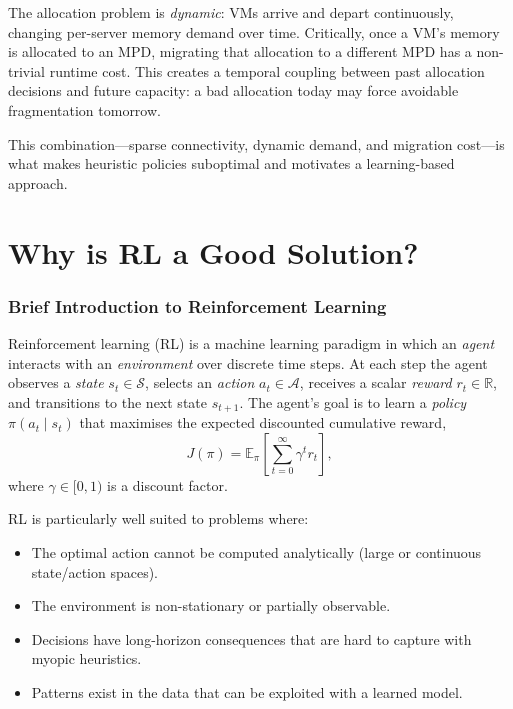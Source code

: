 \documentclass[11pt]{article}
\begin{document}
The allocation problem is \emph{dynamic}: VMs arrive and depart continuously,
changing per-server memory demand over time.  Critically, once a VM's memory is
allocated to an MPD, migrating that allocation to a different MPD has a
non-trivial runtime cost.  This creates a temporal coupling between past
allocation decisions and future capacity: a bad allocation today may force
avoidable fragmentation tomorrow.

This combination---sparse connectivity, dynamic demand, and migration cost---is
what makes heuristic policies suboptimal and motivates a learning-based
approach.

\section{Why is RL a Good Solution?}

\subsubsection*{Brief Introduction to Reinforcement Learning}

Reinforcement learning (RL) is a machine learning paradigm in which an
\emph{agent} interacts with an \emph{environment} over discrete time steps.
At each step the agent observes a \emph{state} $s_t \in \mathcal{S}$, selects
an \emph{action} $a_t \in \mathcal{A}$, receives a scalar \emph{reward}
$r_t \in \mathbb{R}$, and transitions to the next state $s_{t+1}$.  The agent's
goal is to learn a \emph{policy} $\pi(a_t \mid s_t)$ that maximises the
expected discounted cumulative reward,
\[
    J(\pi) = \mathbb{E}_{\pi}\!\left[\sum_{t=0}^{\infty} \gamma^t r_t\right],
\]
where $\gamma \in [0, 1)$ is a discount factor.

RL is particularly well suited to problems where:
\begin{itemize}
    \item The optimal action cannot be computed analytically (large or
          continuous state/action spaces).
    \item The environment is non-stationary or partially observable.
    \item Decisions have long-horizon consequences that are hard to capture
          with myopic heuristics.
    \item Patterns exist in the data that can be exploited with a
          learned model.
\end{itemize}
\end{document}
